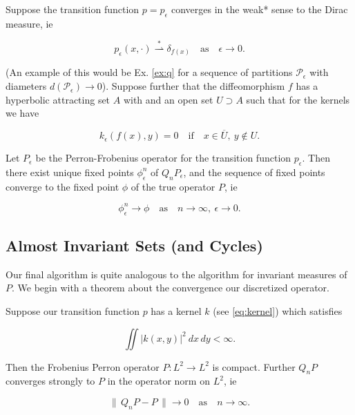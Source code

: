 \begin{proposition}
    \cite*{attr, measure, algGAIO, perturbationsbook, perturbationsart} 
    Suppose the transition function $p = p_\epsilon$ converges in the weak* sense to the 
    Dirac measure, ie 

    \begin{equation}
        p_\epsilon (x, \cdot) \overset{*}{\rightharpoonup} \delta_{f(x)} 
        \quad\text{as}\quad \epsilon \to 0.
    \end{equation}

    (An example of this would be Ex. \ref{ex:q} for a sequence of partitions 
    $\mathcal{P}_\epsilon$ with diameters $d(\mathcal{P}_\epsilon) \to 0$).
    Suppose further that the diffeomorphism $f$ has a hyperbolic attracting set $A$ with
    and an open set $U \supset A$ such that for the kernels we have

    \begin{equation}
        k_\epsilon (f(x), y) = 0 \quad\text{if}\quad x \in \overline{U},\ y \notin U.
    \end{equation}

    Let $P_\epsilon$ be the Perron-Frobenius operator for the transition function 
    $p_\epsilon$. Then there exist unique fixed points $\phi_\epsilon^n$ of $Q_n P_\epsilon$, 
    and the sequence of fixed points converge to the fixed point $\phi$ of the true 
    operator $P$, ie

    \begin{equation}
        \phi_\epsilon^n \to \phi 
        \quad\text{as}\quad n \to \infty,\ \epsilon \to 0.
    \end{equation}

\end{proposition}


\subsection{Almost Invariant Sets (and Cycles)}

Our final algorithm is quite analogous to the algorithm for invariant measures of $P$. We 
begin with a theorem about the convergence our discretized operator.

\begin{theorem}
    \label{thm:QnP}
    \cite*{attr}
    Suppose our transition function $p$ has a kernel $k$ (see \autoref{eq:kernel}) which 
    satisfies 

    \begin{equation}
        \iint |k(x, y)|^2\ dx\,dy < \infty. 
    \end{equation}

    Then the Frobenius Perron operator $P : L^2 \to L^2$ is compact. Further $Q_n P$ 
    converges strongly to $P$ in the operator norm on $L^2$, ie

    \begin{equation}
        \|\, Q_n P - P \,\| \to 0 \quad \text{as} \quad n \to \infty .
    \end{equation}

\end{theorem}

